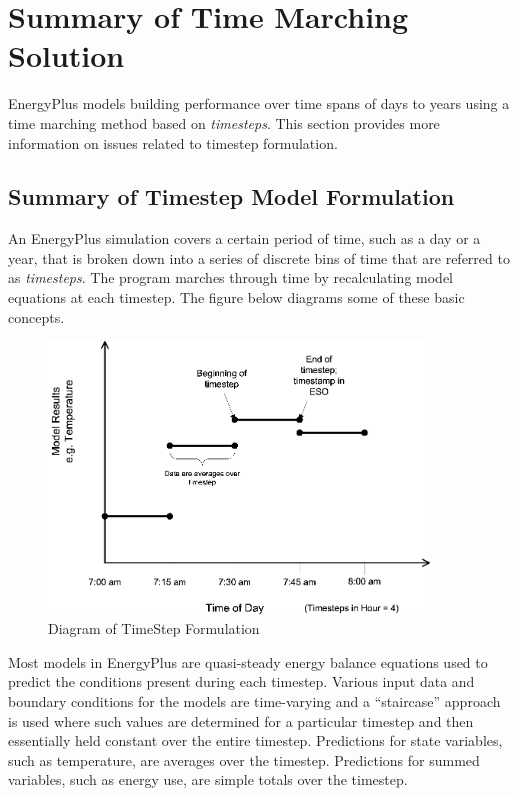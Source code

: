 \section{Summary of Time Marching Solution}\label{summary-of-time-marching-solution}

EnergyPlus models building performance over time spans of days to years using a time marching method based on \emph{timesteps}. This section provides more information on issues related to timestep formulation.

\subsection{Summary of Timestep Model Formulation}\label{summary-of-timestep-model-formulation}

An EnergyPlus simulation covers a certain period of time, such as a day or a year, that is broken down into a series of discrete bins of time that are referred to as \emph{timesteps}. The program marches through time by recalculating model equations at each timestep. The figure below diagrams some of these basic concepts.

\begin{figure}[hbtp] %
\centering
\includegraphics[width=0.9\textwidth, height=0.9\textheight, keepaspectratio=true]{media/image141.png}
\caption{Diagram of TimeStep Formulation \protect \label{fig:diagram-of-timestep-formulation}}
\end{figure}

Most models in EnergyPlus are quasi-steady energy balance equations used to predict the conditions present during each timestep. Various input data and boundary conditions for the models are time-varying and a ``staircase'' approach is used where such values are determined for a particular timestep and then essentially held constant over the entire timestep. Predictions for state variables, such as temperature, are averages over the timestep. Predictions for summed variables, such as energy use, are simple totals over the timestep.

